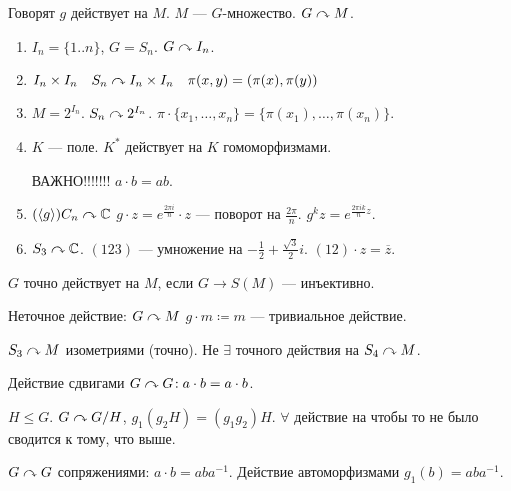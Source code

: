 Говорят $g$ действует на  $M$.  $M$ ---  $G$-множество.  $G \curvearrowright M$.
\begin{example}
    \begin{enumerate}
        \item $I_n = \{1..n\}$,  $G = S_n$.  $G \curvearrowright I_n$. 
        \item  $I_n \times I_n \quad S_n \curvearrowright I_n \times I_n \quad \pi(x, y) = (\pi(x), \pi(y))$
        \item  $M=2^{I_n}$.  $S_n \curvearrowright 2^{I_n}$.  $\pi \cdot \{x_1, \ldots, x_n\} = \{\pi(x_1),\ldots, \pi(x_n)\}$.
        \item $K$ --- поле.  $K^*$ действует на  $K$ гомоморфизмами.
            
            ВАЖНО!!!!!!!  $a\cdot b = ab$.
        \item  $(\langle g \rangle)C_n \curvearrowright \mathbb{C}$  $g \cdot z = e^{\frac{2\pi i}{n}} \cdot z$ --- поворот на $\frac{2\pi}{n}$. $g^{k}z = e^{\frac{2\pi i k}{n}z}.$
        \item $S_3 \curvearrowright \mathbb{C}$.  $(123)$ --- умножение на  $-\frac{1}{2} + \frac{\sqrt{3}}{2}i$. $(12) \cdot z = \overline{z}$.
    \end{enumerate} 
\end{example}
\begin{definition}
    $G$ точно действует на  $M$, если  $G \to S(M)$ --- инъективно. 

    Неточное действие: $G \curvearrowright M$  $g \cdot m \coloneqq m$ --- тривиальное действие.
\end{definition}

$S_3 \curvearrowright M$ изометриями (точно).  Не $\exists$ точного действия на  $S_4 \curvearrowright M$.
\begin{example}
Действие сдвигами $G \curvearrowright G\!: a \cdot b = a \cdot b$.

 $H \le G$. $G \curvearrowright G / H$,  $g_1 (g_2H) = (g_1g_2)H$.
 $\forall $ действие на чтобы то не было сводится к тому, что выше.

  $G \curvearrowright G$ сопряжениями:  $a \cdot b = aba^{-1}$. Действие автоморфизмами  $g_1(b) = aba^{-1}$.
\end{example}

